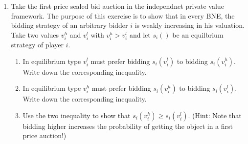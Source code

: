 \documentclass[a4paper,12pt]{article}
\begin{document}
\begin{enumerate}

\item Take the first price sealed bid auction in the independnet private value framework. The purpose of this exercise is to show that in every BNE, the bidding strategy of an arbitrary bidder $i$ is weakly increasing in his valuation. Take two values $v_i^h$ and $v_i^l$ with $v_i^h>v_i^l$ and let $s_i()$ be an equilbrium strategy of player $i$.
  \begin{enumerate}
  \item In equilibrium type $v_i^l$ must prefer bidding $s_i(v_i^l)$ to bidding $s_i(v_i^h)$. Write down the corresponding inequality.
  \item In equilibrium type $v_i^h$ must prefer bidding $s_i(v_i^h)$ to bidding $s_i(v_i^l)$. Write down the corresponding inequality.
  \item Use the two inequality to show that $s_i(v_i^h)\geq s_i(v_i^l)$. (Hint: Note that bidding higher increases the probability of getting the object in a first price auction!)
  \end{enumerate}
  

\end{enumerate}
\end{document}
